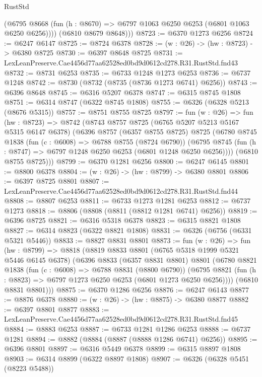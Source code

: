 \begin{lexlean}{RustStd}
\begin{coremodule}
          (@6795 @8668 (fun (h : @8670) => @6797 @1063 @6250 @6253 (@6801 @1063 @6250 @6256))))
        (@6810 @8679 @8648)))
@8723 := @6370 @1273 @6256
@8724 := @6247 @6147
@8725 := @8724 @6378
@8728 := (w : @26) -> (hw : @8723) -> @6380 @8725
@8730 := @6397 @8648 @8725
@8731 := LexLeanPreserve.Cae4456d77aa62528ed0bd9d0612cd278.R31.RustStd.fnd43
@8732 := @8731 @6253
@8735 := @6733 @1248 @1273 @6253
@8736 := @6737 @1248
@8742 := @8730 (@8732 (@8735 (@8736 @1273 @6741) @6256))
@8743 := @6396 @8648
@8745 := @6316 @5207 @6378
@8747 := @6315 @8745 @1808
@8751 := @6314 @8747 (@6322 @8745 @1808)
@8755 := @6326 (@6328 @5213 (@8676 @5315))
@8757 := @8751 @8755 @8725
@8797 := fun (w : @26) =>
  fun (hw : @8723) =>
  @8742
    (@8743
      @8757
      @8725
      (@6765 @5207 @5213 @5167 @5315 @6147 @6378)
      (@6396
        @8757
        (@6357 @8755 @8725)
        @8725
        (@6780
          @8745
          @1838
          (fun (c : @6008) => @6788 @8755 (@8724 @6790))
          (@6795 @8745 (fun (h : @8747) => @6797 @1248 @6250 @6253 (@6801 @1248 @6250 @6256))))
        (@6810 @8755 @8725)))
@8799 := @6370 @1281 @6256
@8800 := @6247 @6145
@8801 := @8800 @6378
@8804 := (w : @26) -> (hw : @8799) -> @6380 @8801
@8806 := @6397 @8725 @8801
@8807 := LexLeanPreserve.Cae4456d77aa62528ed0bd9d0612cd278.R31.RustStd.fnd44
@8808 := @8807 @6253
@8811 := @6733 @1273 @1281 @6253
@8812 := @6737 @1273
@8818 := @8806 (@8808 (@8811 (@8812 @1281 @6741) @6256))
@8819 := @6396 @8725
@8821 := @6316 @5318 @6378
@8823 := @6315 @8821 @1808
@8827 := @6314 @8823 (@6322 @8821 @1808)
@8831 := @6326 (@6756 (@6331 @5321 @5446))
@8833 := @8827 @8831 @8801
@8873 := fun (w : @26) =>
  fun (hw : @8799) =>
  @8818
    (@8819
      @8833
      @8801
      (@6765 @5318 @1999 @5321 @5446 @6145 @6378)
      (@6396
        @8833
        (@6357 @8831 @8801)
        @8801
        (@6780
          @8821
          @1838
          (fun (c : @6008) => @6788 @8831 (@8800 @6790))
          (@6795 @8821 (fun (h : @8823) => @6797 @1273 @6250 @6253 (@6801 @1273 @6250 @6256))))
        (@6810 @8831 @8801)))
@8875 := @6370 @1286 @6256
@8876 := @6247 @6143
@8877 := @8876 @6378
@8880 := (w : @26) -> (hw : @8875) -> @6380 @8877
@8882 := @6397 @8801 @8877
@8883 := LexLeanPreserve.Cae4456d77aa62528ed0bd9d0612cd278.R31.RustStd.fnd45
@8884 := @8883 @6253
@8887 := @6733 @1281 @1286 @6253
@8888 := @6737 @1281
@8894 := @8882 (@8884 (@8887 (@8888 @1286 @6741) @6256))
@8895 := @6396 @8801
@8897 := @6316 @5449 @6378
@8899 := @6315 @8897 @1808
@8903 := @6314 @8899 (@6322 @8897 @1808)
@8907 := @6326 (@6328 @5451 (@8223 @5488))

\end{coremodule}
\end{lexlean}
